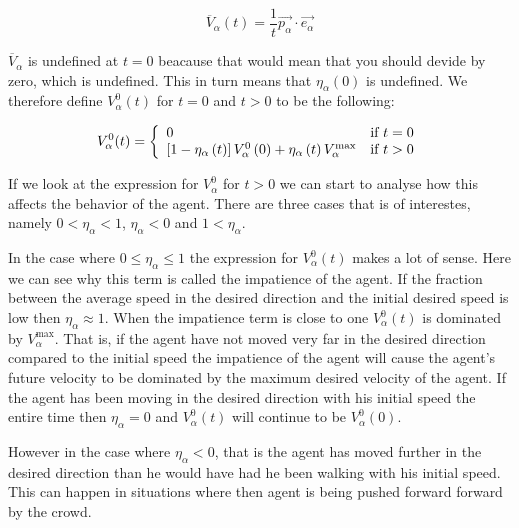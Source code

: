 \begin{equation}\label{averagespeed}
   \overline{V}_{\alpha} \left( t \right) =
   \frac{1}{t} \vec{p_{\alpha}}\cdot \vec{e_{\alpha}} 
\end{equation}

$\overline{V}_{\alpha}$ is undefined at $t=0$ beacause that would mean 
that you should devide by zero, which is undefined. This in turn means 
that $\eta_{\alpha}(0)$ is undefined. We therefore define 
$V_{\alpha}^{0}(t)$ for $t=0$ and $t>0$ to be the following:

\[
  V_{\alpha}^{0} (t) = \left\{ 
  \begin{array}{l l}
    0 & \text{if $t=0$}\\
    \left[ 1 - \eta_{\alpha} \left( t \right) \right] 
    V_{\alpha}^{0} \left( 0 \right) +
    \eta_{\alpha} \left( t \right)V_{\alpha}^{\text{max}} & \text{if 
    $t > 0$}\\
  \end{array} \right.
\]

If we look at the expression for $V_{\alpha}^{0}$ for $t>0$ we can 
start to analyse how this affects the behavior of the agent. There 
are three cases that is of interestes, namely $0 < \eta_{\alpha} < 1$, 
$\eta_{\alpha} < 0$ and $1 < \eta_{\alpha} $.

In the case where $0 \leq \eta_{\alpha} \leq 1$ the expression for 
$V_{\alpha}^{0} \left( t \right)$ makes a lot of sense. Here we can see why this term 
is called the impatience of the agent. If the fraction  between the average 
speed in the desired direction and the initial desired speed is low then 
$\eta_{\alpha} \approx 1$. 
When the impatience term is close to one $V_{\alpha}^{0} \left( t \right)$ is 
dominated by $V_{\alpha}^{\text{max}}$. That is, if the agent have not moved 
very far in the desired direction compared to the initial speed the impatience 
of the agent will cause the agent's future velocity to be dominated by the 
maximum desired velocity of the agent. 
If the agent has been moving in the desired direction with his initial speed 
the entire time then $\eta_{\alpha} = 0$  and $V_{\alpha}^{0} \left( t 
\right)$ will continue to be $V_{\alpha}^{0} \left( 0 \right)$. 

However in the case where $\eta_{\alpha} < 0$, that is the agent has moved 
further in the desired direction than he would have had he been walking with his 
initial speed. This can happen in situations where then agent is being pushed 
forward forward by the crowd.

